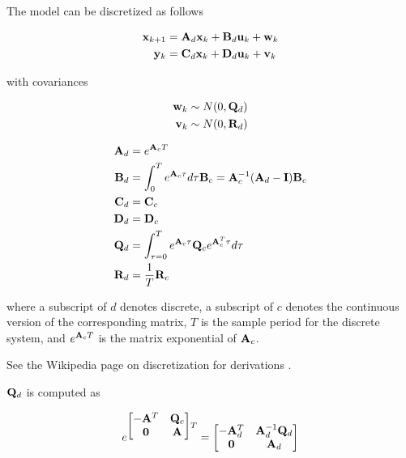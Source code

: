 The model can be discretized as follows

\begin{align*}
  \mathbf{x}_{k+1} &= \mathbf{A}_d \mathbf{x}_k + \mathbf{B}_d \mathbf{u}_k + \mathbf{w}_k \\
   \mathbf{y}_k &= \mathbf{C}_d \mathbf{x}_k + \mathbf{D}_d \mathbf{u}_k + \mathbf{v}_k
\end{align*}

with covariances

\begin{align*}
  \mathbf{w}_k &\sim N(0, \mathbf{Q}_d) \\
  \mathbf{v}_k &\sim N(0, \mathbf{R}_d)
\end{align*}

\begin{theorem}
  \begin{align}
    \mathbf{A}_d &= e^{\mathbf{A}_c T} \\
    \mathbf{B}_d &= \int_0^T e^{\mathbf{A}_c \tau} d\tau \mathbf{B}_c =
      \mathbf{A}_c^{-1} (\mathbf{A}_d - \mathbf{I}) \mathbf{B}_c \\
    \mathbf{C}_d &= \mathbf{C}_c \\
    \mathbf{D}_d &= \mathbf{D}_c \\
    \mathbf{Q}_d &= \int_{\tau = 0}^{T} e^{\mathbf{A}_c\tau} \mathbf{Q}_c
      e^{\mathbf{A}_c^T\tau} d\tau \\
    \mathbf{R}_d &= \frac{1}{T} \mathbf{R}_c
  \end{align}

  where a subscript of $d$ denotes discrete, a subscript of $c$ denotes the
  continuous version of the corresponding matrix, $T$ is the sample period for
  the discrete system, and $e^{\mathbf{A}_c T}$ is the matrix exponential of
  $\mathbf{A}_c$.
\end{theorem}

See the Wikipedia page on discretization for derivations
\cite{bib:discretization}.

$\mathbf{Q}_d$ is computed as

\begin{equation*}
  e^{
  \begin{bmatrix}
    -\mathbf{A}^T & \mathbf{Q}_c \\
    \mathbf{0} & \mathbf{A}
  \end{bmatrix}T} =
  \begin{bmatrix}
    -\mathbf{A}_d^T & \mathbf{A}_d^{-1} \mathbf{Q}_d \\
    \mathbf{0} & \mathbf{A}_d
  \end{bmatrix}
\end{equation*}

